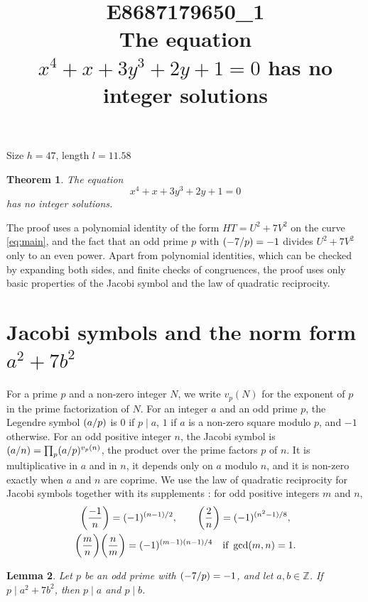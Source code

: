 \documentclass[11pt]{article}
\title{\textbf{E8687179650\_1}\\[4pt] {\Large The equation $x^{4}+x+3y^{3}+2y+1=0$ has no integer solutions}}
\author{}
\date{}
\newtheorem{theorem}{Theorem}
\newtheorem{lemma}[theorem]{Lemma}
\newcommand{\Z}{\mathbb{Z}}
\newcommand{\leg}[2]{\mathchoice{\biggl(\dfrac{#1}{#2}\biggr)}{(#1/#2)}{(#1/#2)}{(#1/#2)}}
\begin{document}
\maketitle
\vspace{-8ex}
\begin{center}
Size $h=47$, length $l=11.58$
\end{center}

\begin{theorem}\label{thm:main}
The equation
\begin{equation}\label{eq:main}
x^{4}+x+3y^{3}+2y+1=0
\end{equation}
has no integer solutions.
\end{theorem}

The proof uses a polynomial identity of the form $HT=U^2+7V^2$ on the curve \eqref{eq:main}, and the fact that an odd prime $p$ with $\leg{-7}{p}=-1$ divides $U^2+7V^2$ only to an even power. Apart from polynomial identities, which can be checked by expanding both sides, and finite checks of congruences, the proof uses only basic properties of the Jacobi symbol and the law of quadratic reciprocity.

\section{\texorpdfstring{Jacobi symbols and the norm form $a^2+7b^2$}{Jacobi symbols and the norm form}}

For a prime $p$ and a non-zero integer $N$, we write $v_p(N)$ for the exponent of $p$ in the prime factorization of $N$. For an integer $a$ and an odd prime $p$, the Legendre symbol $\leg{a}{p}$ is $0$ if $p\mid a$, $1$ if $a$ is a non-zero square modulo $p$, and $-1$ otherwise. For an odd positive integer $n$, the Jacobi symbol is $\leg{a}{n}=\prod_p\leg{a}{p}^{v_p(n)}$, the product over the prime factors $p$ of $n$. It is multiplicative in $a$ and in $n$, it depends only on $a$ modulo $n$, and it is non-zero exactly when $a$ and $n$ are coprime. We use the law of quadratic reciprocity for Jacobi symbols together with its supplements \cite[Chapter~5, \S2]{IR}: for odd positive integers $m$ and $n$,
\begin{gather*}
\leg{-1}{n}=(-1)^{(n-1)/2},\qquad\leg{2}{n}=(-1)^{(n^2-1)/8},\\
\leg{m}{n}\leg{n}{m}=(-1)^{(m-1)(n-1)/4}\quad\text{if }\gcd(m,n)=1.
\end{gather*}

\begin{lemma}\label{lem:divides}
Let $p$ be an odd prime with $\leg{-7}{p}=-1$, and let $a,b\in\Z$. If $p\mid a^2+7b^2$, then $p\mid a$ and $p\mid b$.
\end{lemma}
\end{document}
